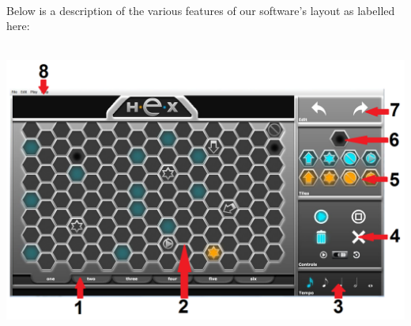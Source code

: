 \documentclass[10pt,a4paper]{article}
\begin{document}
\\
Below is a description of the various features of our software's layout as labelled here:\\
\\
\begin{center}
\includegraphics[scale=0.35]{numlayout.png}
\end{center}
\end{document}
